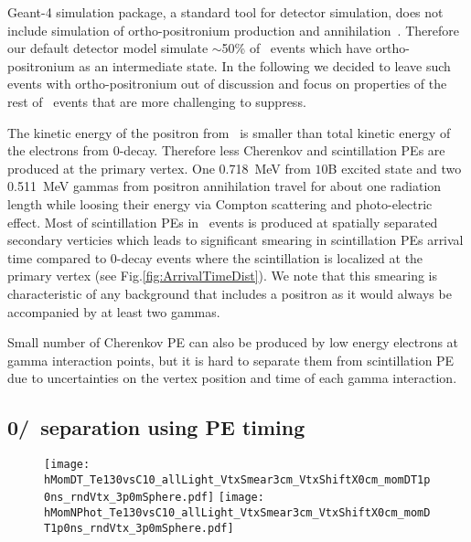 Geant-4 simulation package, a standard tool for detector simulation, does not include simulation of ortho-positronium production and
annihilation~\cite{Geant4-release-and-private-communication}. Therefore our default detector model simulate $\sim$50\% of \C~events which
have ortho-positronium as an intermediate state. In the following we decided to leave such events with ortho-positronium out of discussion 
and focus on properties of the rest of \C~events that are more challenging to suppress.

The kinetic energy of the positron from \C~is smaller than total kinetic energy of the electrons from 0\nbb-decay. Therefore less 
Cherenkov and scintillation PEs are produced at the primary vertex. One 0.718~MeV from $10$B excited state and two 0.511~MeV gammas
from positron annihilation travel for about one radiation length while loosing their energy via Compton scattering and photo-electric effect.
Most of scintillation PEs in \C~events is produced at spatially separated secondary verticies which leads to significant smearing in scintillation 
PEs arrival time compared to 0\nbb-decay events where the scintillation is localized at the primary vertex (see Fig.\ref{fig:ArrivalTimeDist}). 
We note that this smearing is characteristic of any background that includes a positron as it would always be accompanied by at least 
two gammas.

Small number of Cherenkov PE can also be produced by low energy electrons at gamma interaction points, but it is hard to separate them
from scintillation PE due to uncertainties on the vertex position and time of each gamma interaction.



\subsection{0\nbb/\C~separation using PE timing}
\begin{figure}[h]
  \centering
  \texttt{[image: hMomDT\_Te130vsC10\_allLight\_VtxSmear3cm\_VtxShiftX0cm\_momDT1p0ns\_rndVtx\_3p0mSphere.pdf]}
  \texttt{[image: hMomNPhot\_Te130vsC10\_allLight\_VtxSmear3cm\_VtxShiftX0cm\_momDT1p0ns\_rndVtx\_3p0mSphere.pdf]}
  \caption{}
\label{fig:0nbb-C10_timing_separation}
\end{figure}

